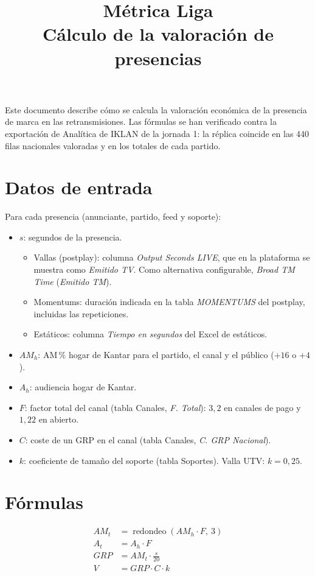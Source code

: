 \documentclass[11pt,a4paper]{article}
\title{Métrica Liga\\[2pt]\large Cálculo de la valoración de presencias}
\author{}
\date{}
\begin{document}
\maketitle

Este documento describe cómo se calcula la valoración económica de la presencia de marca en las retransmisiones. Las fórmulas se han verificado contra la exportación de Analítica de IKLAN de la jornada 1: la réplica coincide en las 440 filas nacionales valoradas y en los totales de cada partido.

\section*{Datos de entrada}

Para cada presencia (anunciante, partido, feed y soporte):

\begin{itemize}
  \item $s$: segundos de la presencia.
  \begin{itemize}
    \item Vallas (postplay): columna \textit{Output Seconds LIVE}, que en la plataforma se muestra como \textit{Emitido TV}. Como alternativa configurable, \textit{Broad TM Time} (\textit{Emitido TM}).
    \item Momentums: duración indicada en la tabla \textit{MOMENTUMS} del postplay, incluidas las repeticiones.
    \item Estáticos: columna \textit{Tiempo en segundos} del Excel de estáticos.
  \end{itemize}
  \item $AM_h$: AM\,\% hogar de Kantar para el partido, el canal y el público ($+16$ o $+4$).
  \item $A_h$: audiencia hogar de Kantar.
  \item $F$: factor total del canal (tabla Canales, \textit{F. Total}): $3{,}2$ en canales de pago y $1{,}22$ en abierto.
  \item $C$: coste de un GRP en el canal (tabla Canales, \textit{C. GRP Nacional}).
  \item $k$: coeficiente de tamaño del soporte (tabla Soportes). Valla UTV: $k = 0{,}25$.
\end{itemize}

\section*{Fórmulas}

\begin{align}
AM_t &= \operatorname{redondeo}\left(AM_h \cdot F,\ 3\right) \\[4pt]
A_t  &= A_h \cdot F \\[4pt]
GRP  &= AM_t \cdot \frac{s}{20} \\[4pt]
V    &= GRP \cdot C \cdot k
\end{align}
\end{document}
